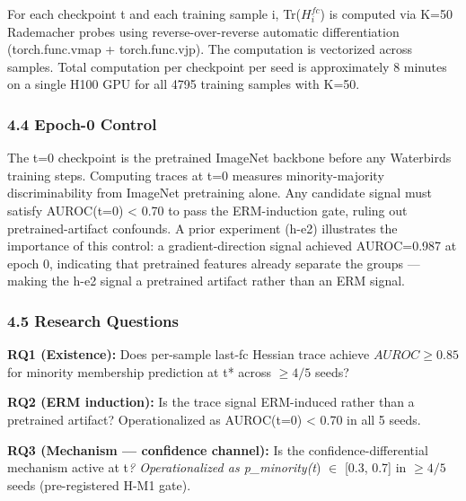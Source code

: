 For each checkpoint t and each training sample i, Tr($H_i^{fc}$) is computed via K=50 Rademacher probes using reverse-over-reverse automatic differentiation (torch.func.vmap + torch.func.vjp). The computation is vectorized across samples. Total computation per checkpoint per seed is approximately 8 minutes on a single H100 GPU for all 4795 training samples with K=50.

\subsubsection{4.4 Epoch-0 Control}

The t=0 checkpoint is the pretrained ImageNet backbone before any Waterbirds training steps. Computing traces at t=0 measures minority-majority discriminability from ImageNet pretraining alone. Any candidate signal must satisfy AUROC(t=0) < 0.70 to pass the ERM-induction gate, ruling out pretrained-artifact confounds. A prior experiment (h-e2) illustrates the importance of this control: a gradient-direction signal achieved AUROC=0.987 at epoch 0, indicating that pretrained features already separate the groups --- making the h-e2 signal a pretrained artifact rather than an ERM signal.

\subsubsection{4.5 Research Questions}

\textbf{RQ1 (Existence):} Does per-sample last-fc Hessian trace achieve $AUROC\geq 0.85$ for minority membership prediction at t* across $\geq 4/5$ seeds?

\textbf{RQ2 (ERM induction):} Is the trace signal ERM-induced rather than a pretrained artifact? Operationalized as AUROC(t=0) < 0.70 in all 5 seeds.

\textbf{RQ3 (Mechanism --- confidence channel):} Is the confidence-differential mechanism active at t\textit{? Operationalized as p\_minority(t}) $\in$ [0.3, 0.7] in $\geq 4/5$ seeds (pre-registered H-M1 gate).
